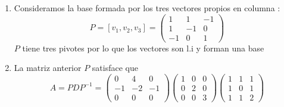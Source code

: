 \documentclass[letter]{memoir} %
\begin{document}
\begin{enumerate}
\begin{enumerate}
\begin{enumerate}
\end{enumerate}
\item Consideramos la base formada por los tres vectores propios en columna : 
\[P = [v_1, v_2, v_3] = \begin{pmatrix}
		 1 &1 &-1\\
         1 &-1& 0\\
         -1 &0 &1
        \end{pmatrix}
\]
$P$ tiene tres pivotes por lo que los vectores son l.i y forman una base 
\item La matriz anterior $P$ satisface que 
\[
A = PDP^{-1} =  \begin{pmatrix}
	0 & 4 & 0 \\
   -1 &-2  &-1 \\
    0 &0 & 0
    \end{pmatrix} 
 \begin{pmatrix}
	1 & 0 & 0 \\
   0 & 2  & 0 \\
    0 &0 & 3
    \end{pmatrix}     
    \begin{pmatrix}
	1 & 1 & 1 \\
   1 & 0  & 1 \\
    1 &1 & 2
    \end{pmatrix}     
\]
\end{enumerate}



\end{enumerate}
\end{document}
